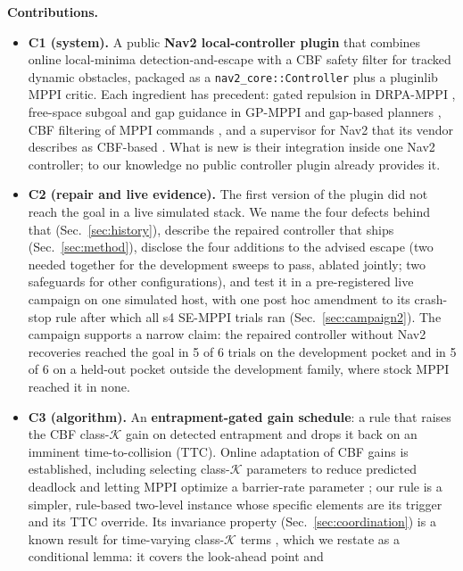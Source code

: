 \documentclass[journal]{IEEEtran}
\begin{document}
\textbf{Contributions.}
\begin{itemize}
\item \textbf{C1 (system).} A public \textbf{Nav2 local-controller
  plugin} that combines online local-minima detection-and-escape with a
  CBF safety filter for tracked dynamic obstacles, packaged as a
  \texttt{nav2\_core::Controller} plus a pluginlib MPPI critic. Each
  ingredient has precedent: gated repulsion in DRPA-MPPI
  \cite{drpa_mppi}, free-space subgoal and gap guidance in GP-MPPI
  \cite{gp_mppi} and gap-based planners \cite{potential_gap,safer_gap},
  CBF filtering of MPPI commands \cite{scbf_mppi}, and a supervisor for
  Nav2 that its vendor describes as CBF-based
  \cite{nav2_3laws,threelaws_pr}. What is new is their integration inside
  one Nav2 controller; to our knowledge no public controller plugin
  already provides it.
\item \textbf{C2 (repair and live evidence).} The first version of the
  plugin did not reach the goal in a live simulated stack. We name the
  four defects behind that (Sec.~\ref{sec:history}), describe the repaired
  controller that ships (Sec.~\ref{sec:method}), disclose the four
  additions to the advised escape (two needed together for the development
  sweeps to pass, ablated jointly; two safeguards for other configurations), and test
  it in a pre-registered live campaign on one simulated host, with one post hoc
  amendment to its crash-stop rule after which all s4 SE-MPPI trials ran
  (Sec.~\ref{sec:campaign2}). The campaign supports a narrow claim: the
  repaired controller without Nav2 recoveries reached the goal in 5 of 6
  trials on the development pocket and in 5 of 6 on a held-out pocket
  outside the development family, where stock MPPI reached it in none.
\item \textbf{C3 (algorithm).} An \textbf{entrapment-gated gain
  schedule}: a rule that raises the CBF class-$\mathcal{K}$ gain on
  detected entrapment and drops it back on an imminent time-to-collision
  (TTC). Online adaptation of CBF gains is established, including
  selecting class-$\mathcal{K}$ parameters to reduce predicted deadlock
  \cite{kim_adaptive_cbf} and letting MPPI optimize a barrier-rate
  parameter \cite{br_mppi}; our rule is a simpler, rule-based two-level
  instance whose specific elements are its trigger and its TTC override.
  Its invariance property (Sec.~\ref{sec:coordination}) is a known result
  for time-varying class-$\mathcal{K}$ terms \cite{ada_cbf,rt_cbf}, which
  we restate as a conditional lemma: it covers the look-ahead point and

\end{itemize}
\end{document}
